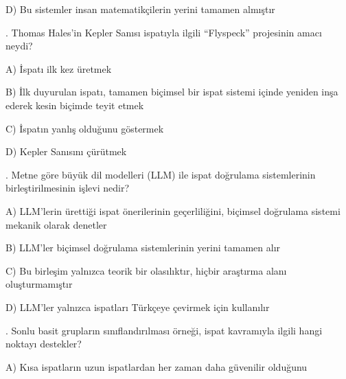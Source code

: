 \par\noindent\hspace*{1.6em}D) Bu sistemler insan matematikçilerin yerini tamamen almıştır

\par\smallskip{}. Thomas Hales’in Kepler Sanısı ispatıyla ilgili “Flyspeck” projesinin amacı neydi?

\par\noindent\hspace*{1.6em}A) İspatı ilk kez üretmek

\par\noindent\hspace*{1.6em}B) İlk duyurulan ispatı, tamamen biçimsel bir ispat sistemi içinde yeniden inşa ederek kesin biçimde teyit etmek

\par\noindent\hspace*{1.6em}C) İspatın yanlış olduğunu göstermek

\par\noindent\hspace*{1.6em}D) Kepler Sanısını çürütmek

\par\smallskip{}. Metne göre büyük dil modelleri (LLM) ile ispat doğrulama sistemlerinin birleştirilmesinin işlevi nedir?

\par\noindent\hspace*{1.6em}A) LLM’lerin ürettiği ispat önerilerinin geçerliliğini, biçimsel doğrulama sistemi mekanik olarak denetler

\par\noindent\hspace*{1.6em}B) LLM’ler biçimsel doğrulama sistemlerinin yerini tamamen alır

\par\noindent\hspace*{1.6em}C) Bu birleşim yalnızca teorik bir olasılıktır, hiçbir araştırma alanı oluşturmamıştır

\par\noindent\hspace*{1.6em}D) LLM’ler yalnızca ispatları Türkçeye çevirmek için kullanılır

\par\smallskip{}. Sonlu basit grupların sınıflandırılması örneği, ispat kavramıyla ilgili hangi noktayı destekler?

\par\noindent\hspace*{1.6em}A) Kısa ispatların uzun ispatlardan her zaman daha güvenilir olduğunu

